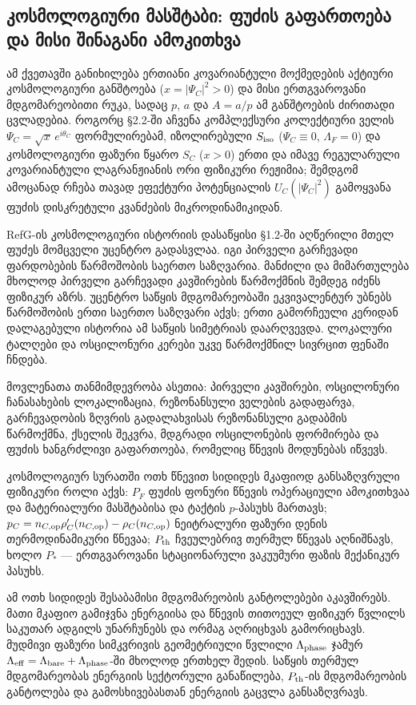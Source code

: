 \documentclass[11pt,a4paper]{article}
\begin{document}
\subsection{კოსმოლოგიური მასშტაბი: ფუძის გაფართოება და მისი შინაგანი ამოკითხვა}

ამ ქვეთავში განიხილება ერთიანი კოვარიანტული მოქმედების აქტიური კოსმოლოგიური განშტოება ($x = |\Psi_C|^2 > 0$) და მისი ერთგვაროვანი მდგომარეობითი რუკა, სადაც $p$, $a$ და $A=a/p$ ამ განშტოების ძირითადი ცვლადებია. როგორც §2.2-ში აჩვენა კომპლექსური კოლექტიური ველის $\Psi_C = \sqrt{x}\,e^{i\theta_C}$ ფორმულირებამ, იზოლირებული $S_{\rm iso}$ ($\Psi_C \equiv 0$, $\Lambda_F = 0$) და კოსმოლოგიური ფაზური წყარო $S_C$ ($x > 0$) ერთი და იმავე რეგულარული კოვარიანტული ლაგრანჟიანის ორი ფიზიკური რეჟიმია; შემდგომ ამოცანად რჩება თავად ეფექტური პოტენციალის $U_C(|\Psi_C|^2)$ გამოყვანა ფუძის დისკრეტული კვანძების მიკროდინამიკიდან.

RefG-ის კოსმოლოგიური ისტორიის დასაწყისი §1.2-ში აღწერილი მთელ ფუძეს მომცველი უცენტრო გადასვლაა. იგი პირველი გარჩევადი ფარდობების წარმოშობის საერთო საზღვარია. მანძილი და მიმართულება მხოლოდ პირველი გარჩევადი კავშირების წარმოქმნის შემდეგ იძენს ფიზიკურ აზრს. უცენტრო საწყის მდგომარეობაში ეკვივალენტურ უბნებს წარმოშობის ერთი საერთო საზღვარი აქვს; ერთი გამორჩეული კერიდან დალაგებული ისტორია ამ საწყის სიმეტრიას დაარღვევდა. ლოკალური ტალღები და ოსცილონური კერები უკვე წარმოქმნილ სივრცით ფენაში ჩნდება.

მოვლენათა თანმიმდევრობა ასეთია: პირველი კავშირები, ოსცილონური ჩანასახების ლოკალიზაცია, რეზონანსული ველების გადაფარვა, გარჩევადობის ზღვრის გადალახვისას რეზონანსული გადაბმის წარმოქმნა, ქსელის შეკვრა, მდგრადი ოსცილონების ფორმირება და ფუძის ხანგრძლივი გაფართოება, რომელიც წნევის მოდუნებას იწვევს.

კოსმოლოგიურ სურათში ოთხ წნევით სიდიდეს მკაფიოდ განსაზღვრული ფიზიკური როლი აქვს: $P_F$ ფუძის ფონური წნევის ოპერაციული ამოკითხვაა და მატერიალური მასშტაბისა და ტაქტის $p$-პასუხს მართავს; $p_C=n_{C,{\rm op}}\rho_C'(n_{C,{\rm op}})-\rho_C(n_{C,{\rm op}})$ ნეიტრალური ფაზური დენის თერმოდინამიკური წნევაა; $P_{\rm th}$ ჩვეულებრივ თერმულ წნევას აღნიშნავს, ხოლო $P_*$ — ერთგვაროვანი სტაციონარული ვაკუუმური ფაზის მექანიკურ პასუხს.

ამ ოთხ სიდიდეს შესაბამისი მდგომარეობის განტოლებები აკავშირებს. მათი მკაფიო გამიჯვნა ენერგიისა და წნევის თითოეულ ფიზიკურ წვლილს საკუთარ ადგილს უნარჩუნებს და ორმაგ აღრიცხვას გამორიცხავს. მუდმივი ფაზური სიმკვრივის გეომეტრიული წვლილი $\Lambda_{\rm phase}$ ჯამურ $\Lambda_{\rm eff}=\Lambda_{\rm bare}+\Lambda_{\rm phase}$-ში მხოლოდ ერთხელ შედის. საწყის თერმულ მდგომარეობას ენერგიის სექტორული განაწილება, $P_{\rm th}$-ის მდგომარეობის განტოლება და გამოსხივებასთან ენერგიის გაცვლა განსაზღვრავს.
\end{document}
